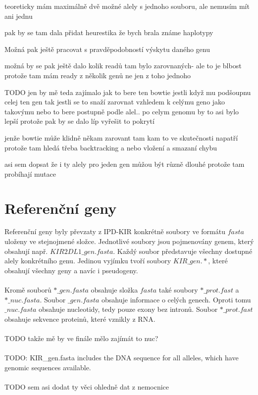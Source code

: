 \documentclass[czech,DP]{thesiskiv}
\numberwithin{equation}{section}
\begin{document}
teoreticky mám maximálně dvě možné alely s jednoho souboru, ale nemusím mít ani jednu 

pak by se tam dala přidat heurestika že bych brala známe haplotypy

Možná pak ještě pracovat s pravděpodobností výskytu daného genu

možná by se pak ještě dalo kolik readů tam bylo zarovnaných- ale to je blbost protože tam mám ready z několik genů ne jen z toho jednoho 

TODO jen by mě teda zajímalo jak to bere ten bowtie jestli když mu podšoupnu celej ten gen tak jestli se to snaží zarovnat vzhledem k celýmu geno jako takovýmu nebo to bere postupně podle alel.. 
po celym genomu by to asi bylo lepší protože pak by se dalo líp vyřešit to pokrytí 

jenže bowtie může klidně někam zarovant tam kam to ve skutečnosti napatří protože tam hledá třeba backtracking a nebo vložení a smazaní chybu


asi sem dopsat že i ty alely pro jeden gen můžou být různě dlouhé protože tam probíhají mutace

\section{Referenční geny}
Referenční geny byly převzaty z IPD-KIR \cite{imgt_hla_database} konkrétně soubory ve formátu $fasta$ uloženy ve stejnojmené složce. Jednotlivé soubory jsou pojmenovány genem, který obsahují např. $KIR2DL1\_gen.fasta$. Každý soubor představuje všechny dostupné alely konkrétního genu. Jedinou vyjímku tvoří soubory $KIR\_gen.*$, které obsahují všechny geny a navíc i pseudogeny. 
\\
\\
Kromě souborů $*\_gen.fasta$ obsahuje složka $fasta$ také soubory $*\_prot.fast$ a $*\_nuc.fasta$. Soubor $\_gen.fasta$ obsahuje informace o celých genech. Oproti tomu $\_nuc.fasta$ obsahuje nucleotidy, tedy pouze exony bez intronů. Soubor $*\_prot.fast$ obsahuje sekvence proteinů, které vznikly z RNA. 
\\
\\
TODO takže mě by ve finále mělo zajímát to nuc? 
\\
\\
TODO: KIR\_gen.fasta  includes the DNA sequence for all alleles, which have genomic sequences available.
\\
\\
TODO sem asi dodat ty věci ohledně dat z nemocnice
\end{document}
